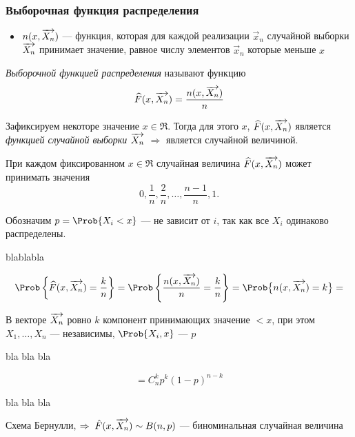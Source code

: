 \subsubsection{Выборочная функция распределения}

\begin{itemize}
	\item $n(x, \overrightarrow{X_n})$ --- функция, которая для каждой реализации $\vec{x}_n$ случайной выборки $\overrightarrow{X_n}$ принимает значение, равное числу элементов $\vec{x}_n$ которые меньше $x$
\end{itemize}

\begin{defn}
	\emph{Выборочной функцией распределения} называют функцию
	\begin{equation}
		\widehat{F}(x, \overrightarrow{X_n}) = \frac{n(x, \overrightarrow{X_n})}{n}
	\end{equation}
\end{defn}
\begin{rem}
	Зафиксируем некоторе значение $x \in \Re$. Тогда для этого $x$, $\widehat{F}(x, \overrightarrow{X_n})$ является \emph{функцией случайной выборки $\overrightarrow{X_n}$} $\Rightarrow$ является случайной величиной.
\end{rem}
\begin{rem}
	При каждом фиксированном $x \in \Re$ случайная величина $\widehat{F}(x, \overrightarrow{X_n})$ может принимать значения
	\[
		0, \frac{1}{n}, \frac{2}{n}, \dots, \frac{n-1}{n}, 1.
	\]
\end{rem}

Обозначим $p = \Prob \{ X_i < x \}$ --- не зависит от $i$, так как все $X_i$ одинаково распределены.

blablabla

\[
	\Prob \left\{ \widehat{F}(x, \vvec{X_n}) = \frac{k}{n} \right\} = \Prob \left\{ \frac{n(x, \vvec{X_n})}{n} = \frac{k}{n} \right\} = \Prob \bigl\{ n(x, \vvec{X_n}) = k \bigr\} = 
\]

В векторе $\overrightarrow{X_n}$ ровно $k$ компонент принимающих значение $< x$, при этом $X_1, \dots, X_n$ --- независимы, $\Prob \{ X_i , x \}$ --- $p$ 

bla bla bla

\[
	= C_n^k p^k (1 - p)^{n-k}
\]

bla bla bla

Схема Бернулли, $\Rightarrow\; \hat{F}(x, \overrightarrow{X_n}) \sim B(n, p)$ --- биноминальная случайная величина 

